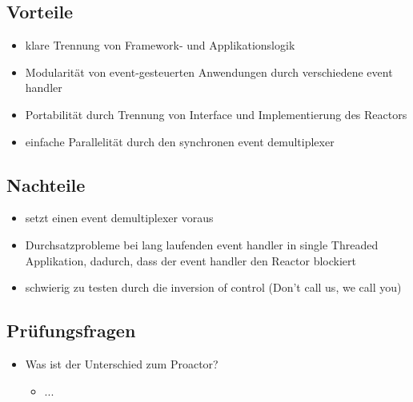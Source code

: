 \subsection*{Vorteile}

\begin{itemize}
	\item klare Trennung von Framework- und Applikationslogik
	\item Modularität von event-gesteuerten Anwendungen durch verschiedene event handler
	\item Portabilität durch Trennung von Interface und Implementierung des Reactors
	\item einfache Parallelität durch den synchronen event demultiplexer
\end{itemize}


\subsection*{Nachteile}

\begin{itemize}
	\item setzt einen event demultiplexer voraus
	\item Durchsatzprobleme bei lang laufenden event handler in single Threaded Applikation, dadurch, dass der event handler den Reactor blockiert
	\item schwierig zu testen durch die inversion of control (Don't call us, we call you)
\end{itemize}


\subsection*{Prüfungsfragen}
\begin{itemize}
	\item Was ist der Unterschied zum Proactor?
	\begin{itemize}
		\item ...
	\end{itemize}
\end{itemize}